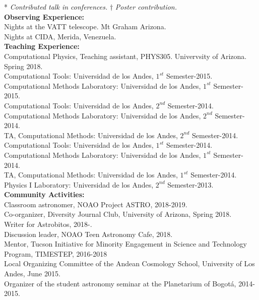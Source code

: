 \documentclass[letterpaper]{article}
\begin{document}
* \textit{Contributed talk in conferences.}
$\dagger$ \textit{Poster contribution.} \\

\textbf{\Large Observing Experience:}\\

 Nights at the VATT telescope. Mt Graham Arizona.\\
 Nights at CIDA, Merida, Venezuela.\\

\textbf{\Large Teaching Experience:}\\

\indent Computational Physics, Teaching assistant, PHYS305. Univervsity of Arizona. Spring 2018.\\
\indent Computational Tools: Universidad de los Andes, $1^{st}$ Semester-2015.\\
\indent Computational Methods Laboratory: Universidad de los Andes, $1^{st}$ Semester-2015.\\
\indent Computational Tools: Universidad de los Andes, $2^{nd}$ Semester-2014.\\
\indent Computational Methods Laboratory: Universidad de los Andes, $2^{nd}$ Semester-2014.\\
\indent TA, Computational Methods: Universidad de los Andes, $2^{nd}$ Semester-2014.\\
\indent Computational Tools: Universidad de los Andes, $1^{st}$ Semester-2014.\\
\indent Computational Methods Laboratory: Universidad de los Andes, $1^{st}$ Semester-2014.\\
\indent TA, Computational Methods: Universidad de los Andes, $1^{st}$ Semester-2014.\\
\indent Physics I Laboratory: Universidad de los Andes, $2^{nd}$ Semester-2013.\\

\textbf{\Large Community Activities:}\\

\indent Classroom astronomer, NOAO Project ASTRO, 2018-2019.\\
\indent Co-organizer, Diversity Journal Club, University of Arizona, Spring 2018.\\
\indent Writer for Astrobitos, 2018-.\\ 
\indent Discussion leader, NOAO Teen Astronomy Cafe, 2018.\\
\indent Mentor, Tucson Initiative for Minority Engagement in Science and Technology Program, TIMESTEP, 2016-2018\\
\indent Local Organizing Committee of the Andean Cosmology School, University of Los Andes, June 2015.\\
\indent Organizer of the student astronomy seminar at the Planetarium of Bogot\'a, 2014-2015.\\
\end{document}

